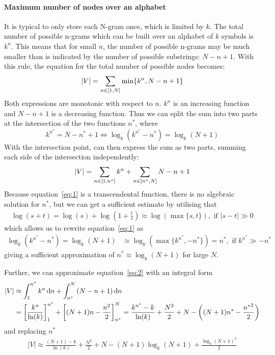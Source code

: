 \paragraph{Maximum number of nodes over an alphabet}
It is typical to only store each N-gram once, which is limited by $k$. The total number of possible n-grams which can be built over an alphabet of $k$ symbols is $k^n$. This means that for small $n$, the number of possible n-grams may be much smaller than is indicated by the number of possible substrings: $N - n + 1$. With this rule, the equation for the total number of possible nodes becomes:
\begin{align*}
    |V| = \sum_{n \in \interval{1}{N}}{\min\{k^n, N - n + 1\}}
\end{align*}
Both expressions are monotonic with respect to $n$. $k^n$ is an increasing function and $N - n + 1$ is a decreasing function. Thus we can split the sum into two parts at the intersection of the two functions $n^*$, where
\begin{equation} \label{eq:1}
    k^{n^*} = N - n^* + 1 \Leftrightarrow \log_k(k^{n^*} - n^*) = \log_k(N + 1)
\end{equation}
With the intersection point, can then express the sum as two parts, summing each side of the intersection independently:
\begin{align} \label{eq:2}
    |V| = \sum_{n \in \interval{1}{n^*}}{k^n} + \sum_{n \in \interval[open left]{n^*}{N}}{N - n + 1}
\end{align}
Because equation~\ref{eq:1} is a transcendental function, there is no algebraic solution for $n^*$, but we can get a sufficient estimate by utilising that
\begin{align*}
    \log(s + t) = \log(s) + \log(1 + \frac{t}{s}) \approx \log(\max\{s, t\}), \text{ if } |s - t| \gg 0
\end{align*}
which allows us to rewrite equation~\ref{eq:1} as 
\begin{align*}
    \log_k(k^{n^*} - n^*) = \log_k(N + 1) &\approx \log_k(\max\{k^{n^*}, - n^*\}) = n^*, \text{ if } k^{n^*} \gg -n^*
\end{align*}
giving a sufficient approximation of $n^* \approx \log_k(N + 1)$ for large $N$.

\noindent
Further, we can approximate equation~\ref{eq:2} with an integral form
\begin{align*}
    |V| &\approx \int_{1}^{n^*}{k^n}\mathop{}\!\mathrm{d} n + \int_{n^*}^{N}{\left(N - n + 1\right)}\mathop{}\!\mathrm{d} n\\
        &= {\left[\frac{k^n}{\ln(k)} \right]}_{1}^{n^*} + {\left[(N + 1)n - \frac{n^2}{2} \right]}_{n^*}^{N}
        = \frac{k^{n^*} - k}{\ln(k)} + \frac{N^2}{2} + N - \left((N + 1)n^* - \frac{{n^*}^2}{2}\right)
\end{align*}
and replacing $n^*$
\begin{align*}
    |V| \approx \frac{(N + 1) - k}{\ln(k)} + \frac{N^2}{2} + N - (N + 1)\log_k(N + 1) + \frac{{\log_k(N+1)}^2}{2}
\end{align*}

